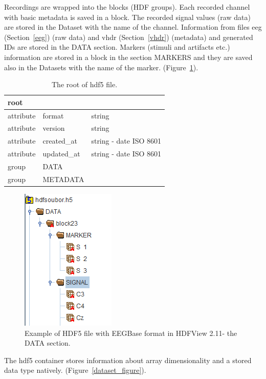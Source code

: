 Recordings are wrapped into the blocks (HDF groups). Each recorded channel with basic metadata is saved in a block. The recorded signal values (raw data) are stored in the Dataset with the name of the channel. Information from files eeg (Section~\ref{eeg}) (raw data) and vhdr (Section~\ref{vhdr}) (metadata) and generated IDs are stored in the DATA section.
Markers (stimuli and artifacts etc.) information are stored in a block in the section MARKERS and they are saved also in the Datasets with the name of the marker. (Figure~\ref{datasection_exp}).
\begin{table}
	\begin{tabular}{l l l}
		root &  & \\ 
		\hline attribute & format & string \\ 
		attribute & version & string \\ 
		attribute & created\_at & string - date ISO 8601 \\ 
		attribute & updated\_at & string - date ISO 8601\\ 
		\hline	 group &  DATA & \\ 
		group & METADATA & \\ 
		\hline	 
	\end{tabular} 
	\caption{The root of \gls{hdf5} file.} 
	\label{file_root}
\end{table}

\begin{figure}
		\includegraphics[scale=0.8]{obrazky/data-section.png}
		\caption{Example of HDF5 file with EEGBase format in HDFView 2.11- the DATA section.}
		\label{datasection_exp}

\end{figure}

The \gls{hdf5} container stores information about array dimensionality and a stored data type natively. (Figure~\ref{dataset_figure}).

